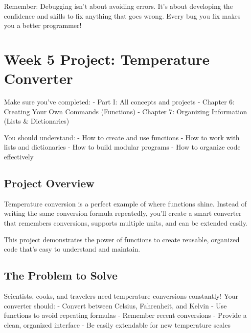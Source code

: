\documentclass[
  letterpaper,
  DIV=11,
  numbers=noendperiod,
  oneside]{scrreprt}
\begin{document}
Remember: Debugging isn't about avoiding errors. It's about developing
the confidence and skills to fix anything that goes wrong. Every bug you
fix makes you a better programmer!

\chapter{Week 5 Project: Temperature
Converter}\label{sec-project-temperature-converter}

\begin{tcolorbox}[enhanced jigsaw, opacityback=0, colback=white, colframe=quarto-callout-important-color-frame, breakable, titlerule=0mm, coltitle=black, rightrule=.15mm, colbacktitle=quarto-callout-important-color!10!white, left=2mm, bottomtitle=1mm, bottomrule=.15mm, title=\textcolor{quarto-callout-important-color}{\faExclamation}\hspace{0.5em}{Before You Start}, opacitybacktitle=0.6, toptitle=1mm, leftrule=.75mm, arc=.35mm, toprule=.15mm]

Make sure you've completed: - Part I: All concepts and projects -
Chapter 6: Creating Your Own Commands (Functions) - Chapter 7:
Organizing Information (Lists \& Dictionaries)

You should understand: - How to create and use functions - How to work
with lists and dictionaries - How to build modular programs - How to
organize code effectively

\end{tcolorbox}

\section{Project Overview}\label{project-overview-4}

Temperature conversion is a perfect example of where functions shine.
Instead of writing the same conversion formula repeatedly, you'll create
a smart converter that remembers conversions, supports multiple units,
and can be extended easily.

This project demonstrates the power of functions to create reusable,
organized code that's easy to understand and maintain.

\section{The Problem to Solve}\label{the-problem-to-solve-4}

Scientists, cooks, and travelers need temperature conversions
constantly! Your converter should: - Convert between Celsius,
Fahrenheit, and Kelvin - Use functions to avoid repeating formulas -
Remember recent conversions - Provide a clean, organized interface - Be
easily extendable for new temperature scales
\end{document}
